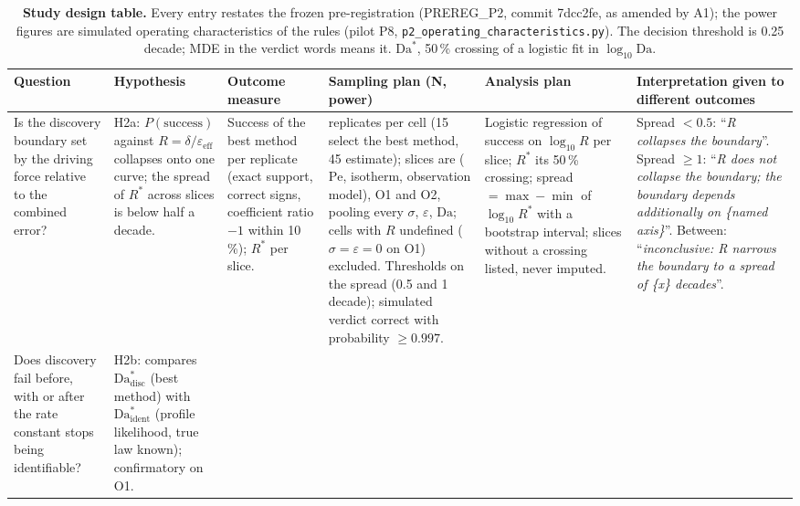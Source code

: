 \documentclass[11pt]{article}
\newcommand{\Da}{\mathrm{Da}}
\newcommand{\Pe}{\mathrm{Pe}}
\newcommand{\verdict}[1]{``\textit{#1}''}
\begin{document}
\begin{landscape}
\begin{table}
\centering
\caption{\textbf{Study design table.} Every entry restates the frozen pre-registration
(PREREG\_P2, commit 7dcc2fe, as amended by A1); the power figures are simulated operating
characteristics of the rules (pilot P8, \texttt{p2\_operating\_characteristics.py}). The
decision threshold is 0.25 decade; MDE in the verdict words means it. $\Da^{*}$, 50\,\% crossing
of a logistic fit in $\log_{10}\Da$.}
\label{tab:design}
\scriptsize
\renewcommand{\arraystretch}{1.25}
\begin{tabularx}{\linewidth}{>{\raggedright\arraybackslash}p{2.6cm}>{\raggedright\arraybackslash}p{3.3cm}>{\raggedright\arraybackslash}p{2.6cm}>{\raggedright\arraybackslash}p{3.6cm}>{\raggedright\arraybackslash}X>{\raggedright\arraybackslash}p{4.4cm}}
\toprule
Question & Hypothesis & Outcome measure & Sampling plan (N, power) & Analysis plan & Interpretation given to different outcomes\\
\midrule
Is the discovery boundary set by the driving force relative to the combined error? &
H2a: $P(\text{success})$ against $R = \delta/\varepsilon_{\mathrm{eff}}$ collapses onto one curve; the spread of $R^{*}$ across slices is below half a decade. &
Success of the best method per replicate (exact support, correct signs, coefficient ratio $-1$ within 10\,\%); $R^{*}$ per slice. &
60 replicates per cell (15 select the best method, 45 estimate); slices are ($\Pe$, isotherm, observation model), O1 and O2, pooling every $\sigma$, $\varepsilon$, $\Da$; cells with $R$ undefined ($\sigma=\varepsilon=0$ on O1) excluded. Thresholds on the spread (0.5 and 1 decade); simulated verdict correct with probability $\ge 0.997$. &
Logistic regression of success on $\log_{10}R$ per slice; $R^{*}$ its 50\,\% crossing; spread $=\max-\min$ of $\log_{10}R^{*}$ with a bootstrap interval; slices without a crossing listed, never imputed. &
Spread $<0.5$: \verdict{R collapses the boundary}. Spread $\ge 1$: \verdict{R does not collapse the boundary; the boundary depends additionally on \{named axis\}}. Between: \verdict{inconclusive: R narrows the boundary to a spread of \{x\} decades}.\\
\addlinespace
Does discovery fail before, with or after the rate constant stops being identifiable? &
H2b: compares $\Da^{*}_{\mathrm{disc}}$ (best method) with $\Da^{*}_{\mathrm{ident}}$ (profile likelihood, true law known); confirmatory on O1. &

\end{tabularx}
\end{table}
\end{landscape}
\end{document}
